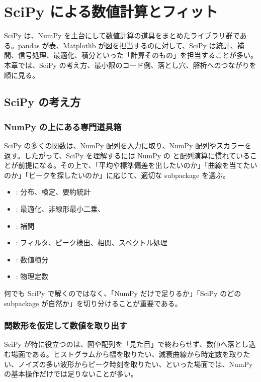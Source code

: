 \chapter{SciPy による数値計算とフィット}
\label{chap:scipy}

SciPy は、NumPy を土台にして数値計算の道具をまとめたライブラリ群である。pandas が表、Matplotlib が図を担当するのに対して、SciPy は統計、補間、信号処理、最適化、積分といった「計算そのもの」を担当することが多い。本章では、SciPy の考え方、最小限のコード例、落とし穴、解析へのつながりを順に見る。

\section{SciPy の考え方}

\subsection{NumPy の上にある専門道具箱}

SciPy の多くの関数は、NumPy 配列を入力に取り、NumPy 配列やスカラーを返す。したがって、SciPy を理解するには NumPy の  と配列演算に慣れていることが前提になる。その上で、「平均や標準偏差を出したいのか」「曲線を当てたいのか」「ピークを探したいのか」に応じて、適切な subpackage を選ぶ。

\begin{itemize}
\item {}: 分布、検定、要約統計
\item {}: 最適化、非線形最小二乗、
\item {}: 補間
\item {}: フィルタ、ピーク検出、相関、スペクトル処理
\item {}: 数値積分
\item {}: 物理定数
\end{itemize}

何でも SciPy で解くのではなく、「NumPy だけで足りるか」「SciPy のどの subpackage が自然か」を切り分けることが重要である。

\subsection{関数形を仮定して数値を取り出す}

SciPy が特に役立つのは、図や配列を「見た目」で終わらせず、数値へ落とし込む場面である。ヒストグラムから幅を取りたい、減衰曲線から時定数を取りたい、ノイズの多い波形からピーク時刻を取りたい、といった場面では、NumPy の基本操作だけでは足りないことが多い。


